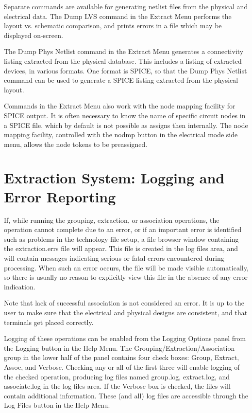 Separate commands are available for generating netlist files from the
physical and electrical data.  The {\cb Dump LVS} command in the {\cb
Extract Menu} performs the layout vs.  schematic comparison, and
prints errors in a file which may be displayed on-screen.

The {\cb Dump Phys Netlist} command in the {\cb Extract Menu}
generates a connectivity listing extracted from the physical database. 
This includes a listing of extracted devices, in various formats.  One
format is SPICE, so that the {\cb Dump Phys Netlist} command can be
used to generate a SPICE listing extracted from the physical layout.

Commands in the {\cb Extract Menu} also work with the node mapping
facility for SPICE output.  It is often necessary to know the name of
specific circuit nodes in a SPICE file, which by default is not
possible as {\Xic} assigns then internally.  The node mapping
facility, controlled with the {\cb nodmp} button in the electrical
mode side menu, allows the node tokens to be preassigned.


\section{Extraction System: Logging and Error Reporting}
If, while running the grouping, extraction, or association operations,
the operation cannot complete due to an error, or if an important
error is identified such as problems in the technology file setup, a
file browser window containing the {\vt extraction.errs} file will
appear.  This file is created in the log files area, and will contain
messages indicating serious or fatal errors encountered during
processing.  When such an error occurs, the file will be made visible
automatically, so there is usually no reason to explicitly view this
file in the absence of any error indication.

Note that lack of successful association is not considered an error. 
It is up to the user to make sure that the electrical and physical
designs are consistent, and that terminals get placed correctly.

Logging of these operations can be enabled from the {\cb Logging
Options} panel from the {\cb Logging} button in the {\cb Help Menu}. 
The {\cb Grouping/Extraction/Association} group in the lower half of
the panel contains four check boxes:  {\cb Group}, {\cb Extract}, {\cb
Assoc}, and {\cb Verbose}.  Checking any or all of the first three
will enable logging of the checked operation, producing log files
named {\vt group.log}, {\vt extract.log}, and {\vt associate.log} in
the log files area.  If the {\cb Verbose} box is checked, the files
will contain additional information.  These (and all) log files are
accessible through the {\cb Log Files} button in the {\cb Help Menu}.

